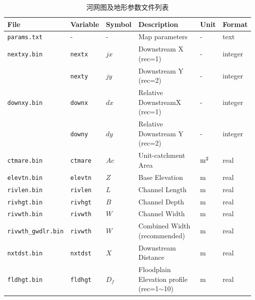 \begin{table}[htbp]
  \centering
  \caption{河网图及地形参数文件列表}
  \label{tab:河网图及地形参数文件列表}
  \begin{tabular}[h]{p{3.5cm}p{1.5cm}p{1.5cm}p{5cm}p{1cm}p{1cm}}  %
    \toprule
    File                       & Variable        & Symbol & Description                                  & Unit      & Format  \\ \midrule
    \texttt{params.txt}        & -               & -      & Map parameters                               & -         & text    \\
    \texttt{nextxy.bin}        & \texttt{nextx}  & $jx$   & Downstream X (rec=1)                         & -         & integer \\
                               & \texttt{nexty}  & $jy$   & Downstream Y (rec=2)                         & -         & integer \\
    \texttt{downxy.bin}        & \texttt{downx}  & $dx$   & Relative DownstreamX (rec=1)                 & -         & integer \\
                               & \texttt{downy}  & $dy$   & Relative Downstream Y (rec=2)                & -         & integer \\
    \texttt{ctmare.bin}        & \texttt{ctmare} & $Ac$   & Unit-catchment Area                          & $\rm m^2$ & real    \\
    \texttt{elevtn.bin}        & \texttt{elevtn} & $Z$    & Base Elevation                               & m         & real    \\
    \texttt{rivlen.bin}        & \texttt{rivlen} & $L$    & Channel Length                               & m         & real    \\
    \texttt{rivhgt.bin}        & \texttt{rivhgt} & $B$    & Channel Depth                                & m         & real    \\
    \texttt{rivwth.bin}        & \texttt{rivwth} & $W$    & Channel Width                                & m         & real    \\
    \texttt{rivwth\_gwdlr.bin} & \texttt{rivwth} & $W$    & Combined Width (recommended)                 & m         & real    \\
    \texttt{nxtdst.bin}        & \texttt{nxtdst} & $X$    & Downstream Distance                          & m         & real    \\
    \texttt{fldhgt.bin}        & \texttt{fldhgt} & $D_f$  & Floodplain Elevation profile (rec=1$\sim$10) & m         & real    \\

\end{tabular}
\end{table}
